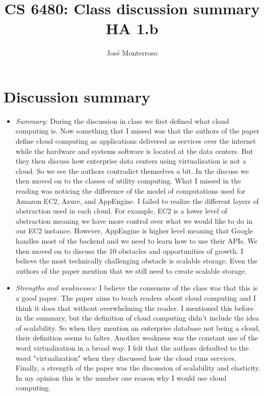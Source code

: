 \documentclass[letterpaper,twocolumn,10pt]{article}
\title{CS 6480: Class discussion summary\\
HA 1.b\\}
\author{José Monterroso}
\affil{School of Computing, University of Utah}
\begin{document}
\maketitle
\section*{Discussion summary}

\begin{itemize}

\item {\it Summary:} 
During the discussion in class we first defined what cloud computing is. Now something that I missed was that 
the authors of the paper define cloud computing as applications delivered as services over the internet while the 
hardware and systems software is located at the data centers. But they then discuss how enterprise data centers using 
virtualization is not a cloud. So we see the authors contradict themselves a bit. In the discuss we then moved on to
the classes of utility computing. What I missed in the reading was noticing the difference of the model of computations used
for Amazon EC2, Azure, and AppEngine. I failed to realize the different layers of abstraction used in each cloud. For example,
EC2 is a lower level of abstraction meaning we have more control over what we would like to do in our EC2 instance. However,
AppEngine is higher level meaning that Google handles most of the backend and we need to learn how to use their APIs. 
We then moved on to discuss the 10 obstacles and opportunities of growth. I believe the most technically challenging obstacle
is scalable storage. Even the authors of the paper mention that we still need to create scalable storage.  

\item {\it Strengths and weaknesses:} 
I believe the consensus of the class was that this is a good paper. The paper aims to teach readers about cloud
computing and I think it does that without overwhelming the reader. I mentioned this before in the summary, but the 
definition of cloud computing didn't include the idea of scalability. So when they mention an enterprise database not being
a cloud, their definition seems to falter. Another weakness was the constant use of the word virtualization in a broad way.
I felt that the authors defaulted to the word "virtualization" when they discussed how the cloud runs services. Finally,
a strength of the paper was the discussion of scalability and elasticity. In my opinion this is the number one reason why I 
would use cloud computing. 


\end{itemize}
\end{document}
